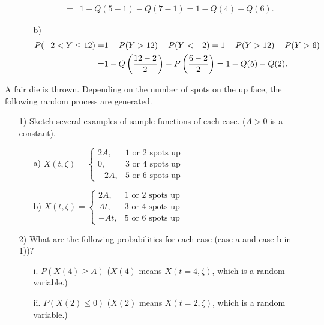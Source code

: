 \documentclass{assignment}
\begin{document}
\begin{sol}
\begin{itemize}
\begin{itemize}
\begin{align}
                =&1-Q(5-1)-Q(7-1)=1-Q(4)-Q(6).
            \end{align}
            \item[b)] 
            \begin{align}
                \notag P(-2<Y\leq 12)=&1-P(Y>12)-P(Y<-2)=1-P(Y>12)-P(Y>6)\\
                =&1-Q\left(\frac{12-2}{2}\right)-P\left(\frac{6-2}{2}\right)=1-Q(5)-Q(2).
            \end{align}
        \end{itemize}
    \end{itemize}
\end{sol}

\begin{prob}
    A fair die is thrown. Depending on the number of spots on the up face, the following random process are generated.
    \begin{itemize}
        \item[1)] Sketch several examples of sample functions of each case. ($A>0$ is a constant).
        \begin{itemize}
            \item[a)] $X(t,\zeta)=\left\{\begin{array}{ll}
                2A,&1\text{ or }2\text{ spots up}\\
                0,&3\text{ or }4\text{ spots up}\\
                -2A,&5\text{ or }6\text{ spots up}
            \end{array}\right.$
            \item[b)] $X(t,\zeta)=\left\{\begin{array}{ll}
                2A,&1\text{ or }2\text{ spots up}\\
                At,&3\text{ or }4\text{ spots up}\\
                -At,&5\text{ or }6\text{ spots up}
            \end{array}\right.$
        \end{itemize}
        \item[2)] What are the following probabilities for each case (case a and case b in 1))?
        \begin{itemize}
            \item[i.] $P(X(4)\geq A)$ ($X(4)$ means $X(t=4,\zeta)$, which is a random variable.)
            \item[ii.] $P(X(2)\leq 0)$ ($X(2)$ means $X(t=2,\zeta)$, which is a random variable.)
        \end{itemize}
    \end{itemize}
\end{prob}
\end{document}
